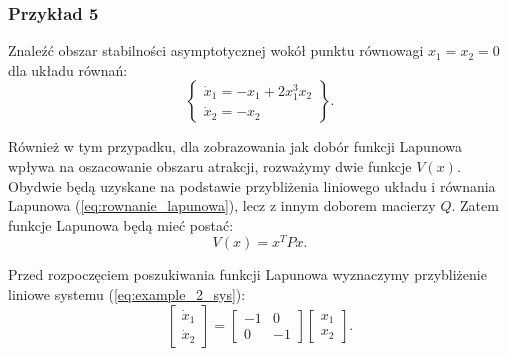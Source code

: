 \documentclass{article}
\begin{document}
        \subsubsection{Przykład 5}
        Znaleźć obszar stabilności asymptotycznej wokół punktu równowagi $x_{1}=x_{2}=0$ dla układu równań:
        \begin{equation}\label{eq:example_2_sys}
            \left\{
            \begin{array}{l}
                 \dot{x}_{1} = -x_{1} + 2x_{1}^{3}x_{2}\\
                 \dot{x}_{2} = -x_{2}
            \end{array}
            \right\}.
        \end{equation}

        Również w tym przypadku, dla zobrazowania jak dobór funkcji Lapunowa wpływa na oszacowanie obszaru atrakcji, rozważymy dwie funkcje $V(x)$.
        Obydwie będą uzyskane na podstawie przybliżenia liniowego układu i równania Lapunowa (\ref{eq:rownanie_lapunowa}), lecz z innym doborem macierzy $Q$.
        Zatem funkcje Lapunowa będą mieć postać:
        $$
            V(x) = x^{T}Px.
        $$

        Przed rozpoczęciem poszukiwania funkcji Lapunowa wyznaczymy przybliżenie liniowe systemu (\ref{eq:example_2_sys}):
        $$
            \begin{bmatrix} \dot{x}_{1} \\ \dot{x}_{2} \end{bmatrix}
            =
            \begin{bmatrix} -1 & 0 \\ 0 & -1 \end{bmatrix}
            \begin{bmatrix} x_{1} \\ x_{2} \end{bmatrix}.
        $$
\end{document}
